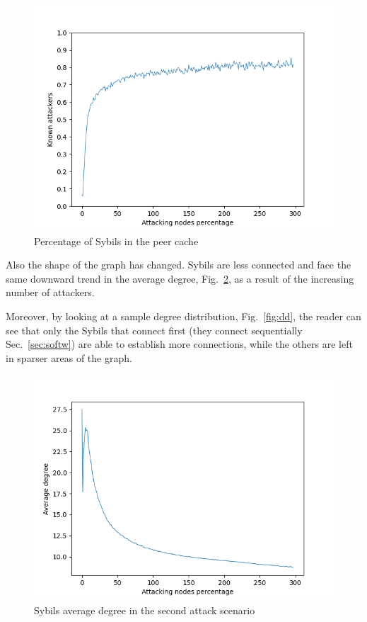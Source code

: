 \begin{figure}[h!]
	\includegraphics[width=.7\textwidth]{pict/results/ex-hon-atk-known.png}
	\centering
	\caption{Percentage of Sybils in the peer cache}
	\label{fig:ex-atk-known}
\end{figure}

Also the shape of the graph has changed. Sybils are less connected and face the same downward trend in the average degree, Fig.~\ref{fig:ex-atk-degree}, as a result of the increasing number of attackers.

Moreover, by looking at a sample degree distribution, Fig.~\ref{fig:dd}, the reader can see that only the Sybils that connect first (they connect sequentially Sec.~\ref{sec:softw}) are able to establish more connections, while the others are left in sparser areas of the graph.\\

\begin{figure}[h!]
	\includegraphics[width=.7\textwidth]{pict/results/ex-atk-avg-degree.png}
	\centering
	\caption{Sybils average degree in the second attack scenario}
	\label{fig:ex-atk-degree}
\end{figure}

